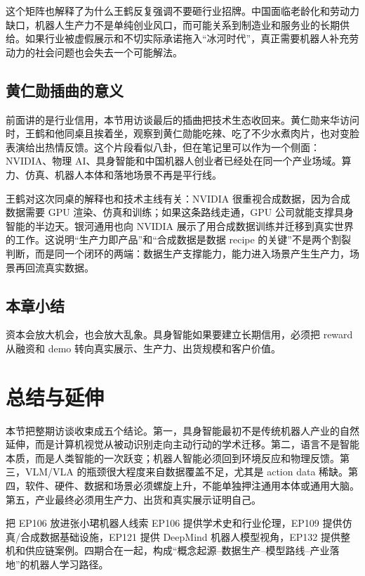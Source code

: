 \documentclass[a4paper]{article}
\begin{document}
这个矩阵也解释了为什么王鹤反复强调不要砸行业招牌。中国面临老龄化和劳动力缺口，机器人生产力不是单纯创业风口，而可能关系到制造业和服务业的长期供给。如果行业被虚假展示和不切实际承诺拖入“冰河时代”，真正需要机器人补充劳动力的社会问题也会失去一个可能解法。

\subsection{黄仁勋插曲的意义}

前面讲的是行业信用，本节用访谈最后的插曲把技术生态收回来。黄仁勋来华访问时，王鹤和他同桌且挨着坐，观察到黄仁勋能吃辣、吃了不少水煮肉片，也对变脸表演给出热情反馈。这个片段看似八卦，但在笔记里可以作为一个侧面：NVIDIA、物理 AI、具身智能和中国机器人创业者已经处在同一个产业场域。算力、仿真、机器人本体和落地场景不再是平行线。

王鹤对这次同桌的解释也和技术主线有关：NVIDIA 很重视合成数据，因为合成数据需要 GPU 渲染、仿真和训练；如果这条路线走通，GPU 公司就能支撑具身智能的半边天。银河通用也向 NVIDIA 展示了用合成数据训练并迁移到真实世界的工作。这说明“生产力即产品”和“合成数据是数据 recipe 的关键”不是两个割裂判断，而是同一个闭环的两端：数据生产支撑能力，能力进入场景产生生产力，场景再回流真实数据。

\subsection{本章小结}

资本会放大机会，也会放大乱象。具身智能如果要建立长期信用，必须把 reward 从融资和 demo 转向真实展示、生产力、出货规模和客户价值。

\section{总结与延伸}

本节把整期访谈收束成五个结论。第一，具身智能最初不是传统机器人产业的自然延伸，而是计算机视觉从被动识别走向主动行动的学术迁移。第二，语言不是智能本质，而是人类智能的一次跃变；机器人智能必须回到环境反应和物理反馈。第三，VLM/VLA 的瓶颈很大程度来自数据覆盖不足，尤其是 action data 稀缺。第四，软件、硬件、数据和场景必须螺旋上升，不能单独押注通用本体或通用大脑。第五，产业最终必须用生产力、出货和真实展示证明自己。

\begin{importantbox}{把 EP106 放进张小珺机器人线索}
EP106 提供学术史和行业伦理，EP109 提供仿真/合成数据基础设施，EP121 提供 DeepMind 机器人模型视角，EP132 提供整机和供应链案例。四期合在一起，构成“概念起源--数据生产--模型路线--产业落地”的机器人学习路径。
\end{importantbox}
\end{document}
